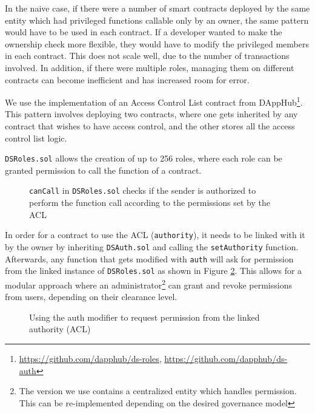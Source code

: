 In the naive case, if there were a number of smart contracts deployed by the same entity which had privileged functions callable only by an owner, the same pattern would have to be used in each contract. If a developer wanted to make the ownership check more flexible, they would have to modify the privileged members in each contract. This does not scale well, due to the number of transactions involved. In addition, if there were multiple roles, managing them on different contracts can become inefficient and has increased room for error.

We use the implementation of an Access Control List contract from DAppHub\footnote{\url{https://github.com/dapphub/ds-roles}, \url{https://github.com/dapphub/ds-auth}}. This pattern involves deploying two contracts, where one gets inherited by any contract that wishes to have access control, and the other stores all the access control list logic. 

\texttt{DSRoles.sol} allows the creation of up to 256 roles, where each role can be granted permission to call the function of a contract. 

\begin{figure}[ht!]
    \centering
    
    \caption{\texttt{canCall} in \texttt{DSRoles.sol} checks if the sender is authorized to perform the function call according to the permissions set by the ACL}
    \label{fig:ownable}
\end{figure}

In order for a contract to use the ACL (\texttt{authority}), it needs to be linked with it by the owner by inheriting \texttt{DSAuth.sol} and calling the \texttt{setAuthority} function. Afterwards, any function that gets modified with \texttt{auth} will ask for permission from the linked instance of \texttt{DSRoles.sol} as shown in Figure \ref{fig:auth-mod}. This allows for a modular approach where an administrator\footnote{The version we use contains a centralized entity which handles permission. This can be re-implemented depending on the desired governance model} can grant and revoke permissions from users, depending on their clearance level.

\begin{figure}[ht!]
    \centering
    
    \caption{Using the auth modifier to request permission from the linked authority (ACL)}
    \label{fig:auth-mod}
\end{figure}

